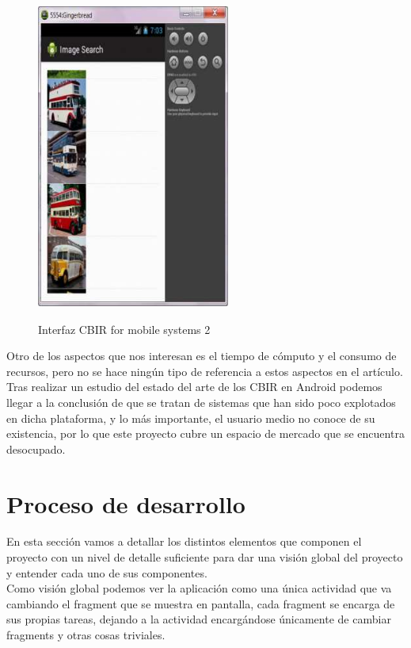 \begin{figure}[H] %
\centering
\includegraphics[scale=0.6]{imagenes/articulo12.png}  %
\label{articulo11}
\caption{Interfaz CBIR for mobile systems 2}
\end{figure}

Otro de los aspectos que nos interesan es el tiempo de cómputo y el consumo de recursos, pero no se hace ningún tipo de referencia a estos aspectos en el artículo.\\

Tras realizar un estudio del estado del arte de los CBIR en Android podemos llegar a la conclusión de que se tratan de sistemas que han sido poco explotados en dicha plataforma, y lo más importante, el usuario medio no conoce de su existencia, por lo que este proyecto cubre un espacio de mercado que se encuentra desocupado.\\

\section{Proceso de desarrollo}

En esta sección vamos a detallar los distintos elementos que componen el proyecto con un nivel de detalle suficiente para dar una visión global del proyecto y entender cada uno de sus componentes.\\

Como visión global podemos ver la aplicación como una única actividad que va cambiando el fragment que se muestra en pantalla, cada fragment se encarga de sus propias tareas, dejando a la actividad encargándose únicamente de cambiar fragments y otras cosas triviales.


